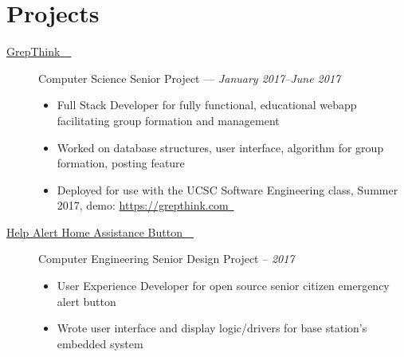 \documentclass[10pt]{article}
\let\orighref\href
\renewcommand{\href}[2]{\orighref{#1}{#2{\scriptsize~\color{darkgray}\faExternalLink}}}
\renewcommand{\url}[1]{\href{#1}{#1}}
\begin{document}
\section*{Projects}
\begin{description}
  \item[\href{https://github.com/grepthink/grepthink}{GrepThink}] Computer
    Science Senior Project --- \textit{January 2017--June 2017}
    \begin{itemize}
      \item Full Stack Developer for fully functional, educational webapp
        facilitating group formation and management
      \item Worked on database structures, user interface, algorithm for group
        formation, posting feature
      \item Deployed for use with the UCSC Software Engineering class, Summer
        2017, demo: \url{https://grepthink.com}
    \end{itemize}
  \item[\href{https://github.com/HaHaSDP-UCSC}{Help Alert Home Assistance
    Button}] Computer Engineering Senior Design Project -- \textit{2017}
    \begin{itemize}
      \item User Experience Developer for open source senior citizen emergency
        alert button
      \item Wrote user interface and display logic/drivers for base station's
        embedded system
    \end{itemize}
\end{description}
\end{document}
